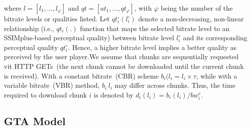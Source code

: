 where $l=[l_{1}, ..., l_{\varphi}]$ and $qt = [at_{1}, ..., qt_{\varphi}]$, with $\varphi$ being the number of the bitrate levels or qualities listed. Let $qt^{\circ}_{i}(l^{\circ}_{i})$ denote a non-decreasing, non-linear relationship (i.e., $qt_{i}(.)$ function that maps the selected bitrate level to an SSIMplus-based perceptual quality) between bitrate level $l^{\circ}_{i}$ and its corresponding perceptual quality $qt^{\circ}_{i}$. Hence, a higher bitrate level implies a better quality as perceived by the user player.We assume that chunks are sequentially requested vit HTTP GETs~(the next chunk cannot be downloaded until the current chunk is received). With a constant bitrate~(CBR) scheme $b_{i}(l_{i} = l_{i} \times \tau$, while with a variable bitrate~(VBR) method, $b_{i} ~ l_{i}$ may differ across chunks. Thus, the time required to download chunk $i$ is denoted by $d_{i}(l_{i}) = b_{i}(l_{i})/bw^{e}_{i}$.


\subsection{GTA Model}

